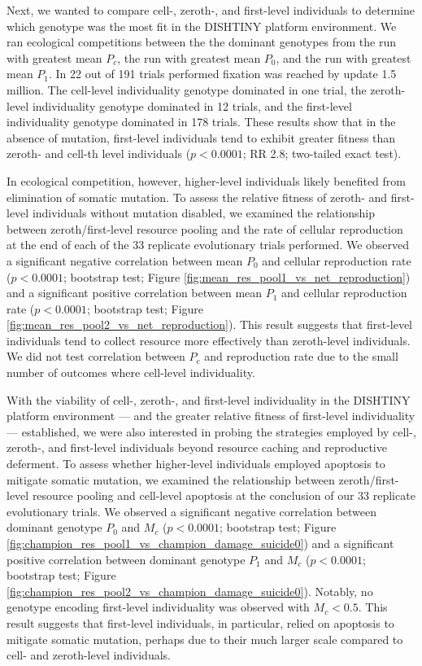 Next, we wanted to compare cell-, zeroth-, and first-level individuals to determine which genotype was the most fit in the DISHTINY platform environment.
We ran ecological competitions between the the dominant genotypes from the run with greatest mean $P_{c}$, the run with greatest mean $P_0$, and the run with greatest mean $P_1$.
In 22 out of 191 trials performed fixation was reached by update 1.5 million.  The cell-level individuality genotype dominated in one trial, the zeroth-level individuality genotype dominated in 12 trials, and the first-level individuality genotype dominated in 178 trials.
These results show that in the absence of mutation, first-level individuals tend to exhibit greater fitness than zeroth- and cell-th level individuals ($p < 0.0001$; RR 2.8; two-tailed exact test).

In ecological competition, however, higher-level individuals likely benefited from elimination of somatic mutation.
To assess the relative fitness of zeroth- and first-level individuals without mutation disabled, we examined the relationship between zeroth/first-level resource pooling and the rate of cellular reproduction at the end of each of the 33 replicate evolutionary trials performed.
We observed a significant negative correlation between mean $P_0$ and cellular reproduction rate ($p < 0.0001$; bootstrap test; Figure \ref{fig:mean_res_pool1_vs_net_reproduction}) and a significant positive correlation between mean $P_1$ and cellular reproduction rate ($p < 0.0001$; bootstrap test; Figure \ref{fig:mean_res_pool2_vs_net_reproduction}).
This result suggests that first-level individuals tend to collect resource more effectively than zeroth-level individuals.
We did not test correlation between $P_{c}$ and reproduction rate due to the small number of outcomes where cell-level individuality.

With the viability of cell-, zeroth-, and first-level individuality in the DISHTINY platform environment --- and the greater relative fitness of first-level individuality --- established, we were also interested in probing the strategies employed by cell-, zeroth-, and first-level individuals beyond resource caching and reproductive deferment.
To assess whether higher-level individuals employed apoptosis to mitigate somatic mutation, we examined the relationship between zeroth/first-level resource pooling and cell-level apoptosis at the conclusion of our 33 replicate evolutionary trials.
We observed a significant negative correlation between dominant genotype $P_0$ and $M_{c}$ ($p < 0.0001$; bootstrap test; Figure \ref{fig:champion_res_pool1_vs_champion_damage_suicide0}) and a significant positive correlation between dominant genotype $P_1$ and $M_{c}$ ($p < 0.0001$; bootstrap test; Figure \ref{fig:champion_res_pool2_vs_champion_damage_suicide0}).
Notably, no genotype encoding first-level individuality was observed with $M_{c} < 0.5$.
This result suggests that first-level individuals, in particular, relied on apoptosis to mitigate somatic mutation, perhaps due to their much larger scale compared to cell- and zeroth-level individuals.

